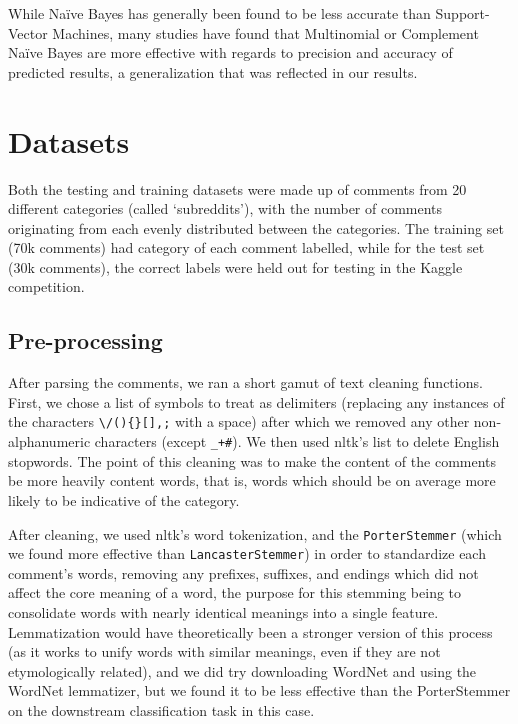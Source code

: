 \documentclass[letterpaper, 11pt]{article}
\begin{document}
While Na\"ive Bayes has generally been found to be less accurate than Support-Vector Machines\cite{twitterNB}, many studies have found that Multinomial\cite{MNBvsNB} or Complement Na\"ive Bayes\cite{Seref:2019} are more effective with regards to precision and accuracy of predicted results, a generalization that was reflected in our results.  

\section{Datasets}

Both the testing and training datasets were made up of comments from 20 different categories (called `subreddits'), with the number of comments originating from each evenly distributed between the categories.  The training set (70k comments) had category of each comment labelled, while for the test set (30k comments), the correct labels were held out for testing in the Kaggle competition.

\subsection{Pre-processing}
After parsing the comments, we ran a short gamut of text cleaning functions.  First, we chose a list of symbols to treat as delimiters (replacing any instances of the characters \texttt{\textbackslash/()\{\}[]\textbar@,;} with a space) after which we removed any other non-alphanumeric characters (except \texttt{\_+\#}). We then used nltk's list to delete English stopwords. The point of this cleaning was to make the content of the comments be more heavily content words, that is, words which should be on average more likely to be indicative of the category.

After cleaning, we used nltk's word tokenization, and the \texttt{PorterStemmer}  (which we found more effective than \texttt{LancasterStemmer}) in order to standardize each comment's words, removing any prefixes, suffixes, and endings which did not affect the core meaning of a word, the purpose for this stemming being to consolidate words with nearly identical meanings into a single feature. Lemmatization would have theoretically been a stronger version of this process (as it works to unify words with similar meanings, even if they are not etymologically related), and we did try downloading WordNet and using the WordNet lemmatizer, but we found it to be less effective than the PorterStemmer on the downstream classification task in this case. 
\end{document}
